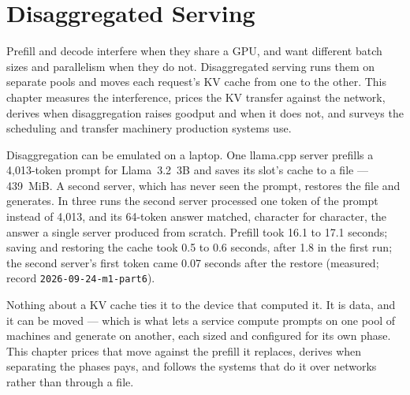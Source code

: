 \chapter{Disaggregated Serving}\label{ch:disaggregated-serving}

\begin{ChapterIntent}
Prefill and decode interfere when they share a GPU, and want different
batch sizes and parallelism when they do not. Disaggregated serving runs them
on separate pools and moves each request's KV cache from one to the other.
This chapter measures the interference, prices the KV transfer against the
network, derives when disaggregation raises goodput and when it does not, and
surveys the scheduling and transfer machinery production systems use.
\end{ChapterIntent}


Disaggregation can be emulated on a laptop. One llama.cpp server prefills a
4,013-token prompt for Llama~3.2~3B and saves its slot's cache to a file ---
439~MiB. A second server, which has never seen the prompt, restores the file
and generates. In three runs the second server processed one token of the
prompt instead of 4,013, and its 64-token answer matched, character for
character, the answer a single server produced from scratch. Prefill took 16.1
to 17.1 seconds; saving and restoring the cache took 0.5 to 0.6 seconds, after
1.8 in the first run; the second server's first token came 0.07 seconds after
the restore (measured; record \texttt{2026-09-24-m1-part6}).

Nothing about a KV cache ties it to the device that computed it. It is data,
and it can be moved --- which is what lets a service compute prompts on one
pool of machines and generate on another, each sized and configured for its
own phase. This chapter prices that move against the prefill it replaces,
derives when separating the phases pays, and follows the systems that do it
over networks rather than through a file.


